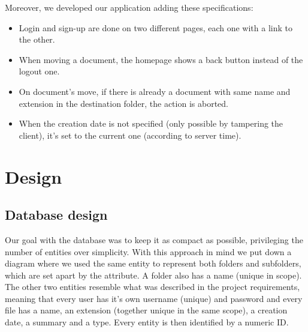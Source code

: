 \documentclass[a4paper, dvipsnames]{article}
\begin{document}
	Moreover, we developed our application adding these specifications:
	\begin{multicols}{2}
		\begin{itemize}
			\item Login and sign-up are done on two different pages, each one with a link to the other.
			\item When moving a document, the homepage shows a back button instead of the logout one.
			\item On document's move, if there is already a document with same name and extension in the destination folder, the action is aborted.
			\item When the creation date is not specified (only possible by tampering the client), it's set to the current one (according to server time).
		\end{itemize}
	\end{multicols}
	
	\pagebreak
	
	\section{Design}
	
	\subsection{Database design}
	\begin{multicols}{2}
		Our goal with the database was to keep it as compact as possible, privileging the number of entities over simplicity. With this approach in mind we put down a diagram where we used the same entity to represent both folders and subfolders, which are set apart by the  attribute. A folder also has a name (unique in scope). The other two entities resemble what was described in the project requirements, meaning that every user has it's own username (unique) and password and every file has a name, an extension (together unique in the same scope), a creation date, a summary and a type. Every entity is then identified by a numeric ID.
	\end{multicols}
	
\end{document}
